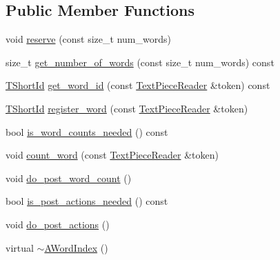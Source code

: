 \subsection*{Public Member Functions}
\begin{DoxyCompactItemize}
\item 
void \hyperlink{classuva_1_1smt_1_1tries_1_1dictionary_1_1_a_word_index_aa4ab5aba3627ab6d85f38ae23f3b66e1}{reserve} (const size\+\_\+t num\+\_\+words)
\item 
size\+\_\+t \hyperlink{classuva_1_1smt_1_1tries_1_1dictionary_1_1_a_word_index_a1cc4951136f05491e1fe6a9e4fe5ab38}{get\+\_\+number\+\_\+of\+\_\+words} (const size\+\_\+t num\+\_\+words) const 
\item 
\hyperlink{namespaceuva_1_1smt_1_1hashing_adcf22e1982ad09d3a63494c006267469}{T\+Short\+Id} \hyperlink{classuva_1_1smt_1_1tries_1_1dictionary_1_1_a_word_index_a71e2ec73dbc78e48d24cdc7bd6cff5dc}{get\+\_\+word\+\_\+id} (const \hyperlink{classuva_1_1smt_1_1file_1_1_text_piece_reader}{Text\+Piece\+Reader} \&token) const 
\item 
\hyperlink{namespaceuva_1_1smt_1_1hashing_adcf22e1982ad09d3a63494c006267469}{T\+Short\+Id} \hyperlink{classuva_1_1smt_1_1tries_1_1dictionary_1_1_a_word_index_a59cb30bc96710c776b7788895281acea}{register\+\_\+word} (const \hyperlink{classuva_1_1smt_1_1file_1_1_text_piece_reader}{Text\+Piece\+Reader} \&token)
\item 
bool \hyperlink{classuva_1_1smt_1_1tries_1_1dictionary_1_1_a_word_index_af09a04eb8a768c9dedbcad906af9da1e}{is\+\_\+word\+\_\+counts\+\_\+needed} () const 
\item 
void \hyperlink{classuva_1_1smt_1_1tries_1_1dictionary_1_1_a_word_index_a2c2538512ccdb89cf1371805e92d9126}{count\+\_\+word} (const \hyperlink{classuva_1_1smt_1_1file_1_1_text_piece_reader}{Text\+Piece\+Reader} \&token)
\item 
void \hyperlink{classuva_1_1smt_1_1tries_1_1dictionary_1_1_a_word_index_af8b78345c3fb4b5dea625108267cd416}{do\+\_\+post\+\_\+word\+\_\+count} ()
\item 
bool \hyperlink{classuva_1_1smt_1_1tries_1_1dictionary_1_1_a_word_index_afd124ead7086c4f9943d3261ee4b4d78}{is\+\_\+post\+\_\+actions\+\_\+needed} () const 
\item 
void \hyperlink{classuva_1_1smt_1_1tries_1_1dictionary_1_1_a_word_index_a30ecbfbd6b316bf1f3ff246bc0fca759}{do\+\_\+post\+\_\+actions} ()
\item 
virtual \hyperlink{classuva_1_1smt_1_1tries_1_1dictionary_1_1_a_word_index_add51fdbee0f95e39c6ffee341ad8d586}{$\sim$\+A\+Word\+Index} ()
\end{DoxyCompactItemize}
